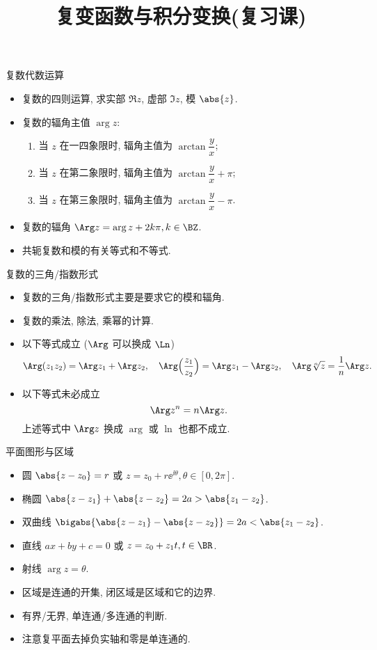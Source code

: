 \documentclass[aspectratio=169,handout]{ctexbeamer}
\title{复变函数与积分变换(复习课)}
\begin{document}
\begin{frame}{复数代数运算}
	\begin{itemize}
		\item 复数的四则运算, 求实部 $\Re z$, 虚部 $\Im z$, 模 $\abs{z}$.
		\item 复数的辐角主值 $\arg z$:
		\begin{enumerate}
			\item 当 $z$ 在一四象限时, 辐角主值为 $\arctan\dfrac yx$;
			\item 当 $z$ 在第二象限时, 辐角主值为 $\arctan\dfrac yx+\pi$;
			\item 当 $z$ 在第三象限时, 辐角主值为 $\arctan\dfrac yx-\pi$.
		\end{enumerate}
		\item 复数的辐角 $\Arg z=\arg z+2k\pi,k\in\BZ$.
		\item 共轭复数和模的有关等式和不等式.
	\end{itemize}
\end{frame}


\begin{frame}{复数的三角/指数形式}
	\begin{itemize}
		\item 复数的三角/指数形式主要是要求它的模和辐角.
		\item 复数的乘法, 除法, 乘幂的计算.
		\item 以下等式成立 ($\Arg$ 可以换成 $\Ln$)
	\[
			\Arg (z_1z_2)=\Arg z_1+\Arg z_2,\quad 
			\Arg\Bigl(\frac{z_1}{z_2}\Bigr)=\Arg z_1-\Arg z_2,\quad
			\Arg\sqrt[n]{z}=\frac1n\Arg z.
	\]
		\item 以下等式未必成立
	\[
			\Arg z^n=n\Arg z.
	\]
		上述等式中 $\Arg z$ 换成 $\arg$ 或 $\ln$ 也都不成立.
	\end{itemize}
\end{frame}


\begin{frame}{平面图形与区域}
	\begin{itemize}
		\item 圆 $\abs{z-z_0}=r$ 或 $z=z_0+r\ee^{\ii\theta},\theta\in[0,2\pi]$.
		\item 椭圆 $\abs{z-z_1}+\abs{z-z_2}=2a>\abs{z_1-z_2}$.
		\item 双曲线 $\bigabs{\abs{z-z_1}-\abs{z-z_2}}=2a<\abs{z_1-z_2}$.
		\item 直线 $ax+by+c=0$ 或 $z=z_0+z_1t,t\in\BR$.
		\item 射线 $\arg z=\theta$.
		\item 区域是连通的开集, 闭区域是区域和它的边界.
		\item 有界/无界, 单连通/多连通的判断.
		\item 注意复平面去掉负实轴和零是单连通的.
	\end{itemize}
\end{frame}
\end{document}
